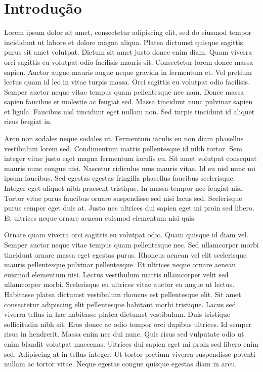 \documentclass[portuguese, 11pt, a4paper,titlepage, oneside]{article}
\title{
  \texttt{[image: assets/logo-deti-black.pdf]}
  \vskip 2.5em
  \Huge Métodos Probabilísticos para\\
  Engenharia Informática
  \vskip .7em
	\bfseries Guião PL04
  \vskip 1.5em
}
\author{Ricardo Almeida\\NMec: 110056\and Rúben Garrido\\NMec: 107927}
\date{\today}
\begin{document}
\maketitle

\tableofcontents
\pagebreak

\section{Introdução}
Lorem ipsum dolor sit amet, consectetur adipiscing elit, sed do eiusmod tempor incididunt ut labore et dolore magna aliqua. Platea dictumst quisque sagittis purus sit amet volutpat. Dictum sit amet justo donec enim diam. Quam viverra orci sagittis eu volutpat odio facilisis mauris sit. Consectetur lorem donec massa sapien. Auctor augue mauris augue neque gravida in fermentum et. Vel pretium lectus quam id leo in vitae turpis massa. Orci sagittis eu volutpat odio facilisis. Semper auctor neque vitae tempus quam pellentesque nec nam. Donec massa sapien faucibus et molestie ac feugiat sed. Massa tincidunt nunc pulvinar sapien et ligula. Faucibus nisl tincidunt eget nullam non. Sed turpis tincidunt id aliquet risus feugiat in.

Arcu non sodales neque sodales ut. Fermentum iaculis eu non diam phasellus vestibulum lorem sed. Condimentum mattis pellentesque id nibh tortor. Sem integer vitae justo eget magna fermentum iaculis eu. Sit amet volutpat consequat mauris nunc congue nisi. Nascetur ridiculus mus mauris vitae. Id eu nisl nunc mi ipsum faucibus. Sed egestas egestas fringilla phasellus faucibus scelerisque. Integer eget aliquet nibh praesent tristique. In massa tempor nec feugiat nisl. Tortor vitae purus faucibus ornare suspendisse sed nisi lacus sed. Scelerisque purus semper eget duis at. Justo nec ultrices dui sapien eget mi proin sed libero. Et ultrices neque ornare aenean euismod elementum nisi quis.

Ornare quam viverra orci sagittis eu volutpat odio. Quam quisque id diam vel. Semper auctor neque vitae tempus quam pellentesque nec. Sed ullamcorper morbi tincidunt ornare massa eget egestas purus. Rhoncus aenean vel elit scelerisque mauris pellentesque pulvinar pellentesque. Et ultrices neque ornare aenean euismod elementum nisi. Lectus vestibulum mattis ullamcorper velit sed ullamcorper morbi. Scelerisque eu ultrices vitae auctor eu augue ut lectus. Habitasse platea dictumst vestibulum rhoncus est pellentesque elit. Sit amet consectetur adipiscing elit pellentesque habitant morbi tristique. Lacus sed viverra tellus in hac habitasse platea dictumst vestibulum. Duis tristique sollicitudin nibh sit. Eros donec ac odio tempor orci dapibus ultrices. Id semper risus in hendrerit. Massa enim nec dui nunc. Quis risus sed vulputate odio ut enim blandit volutpat maecenas. Ultrices dui sapien eget mi proin sed libero enim sed. Adipiscing at in tellus integer. Ut tortor pretium viverra suspendisse potenti nullam ac tortor vitae. Neque egestas congue quisque egestas diam in arcu.
\end{document}

